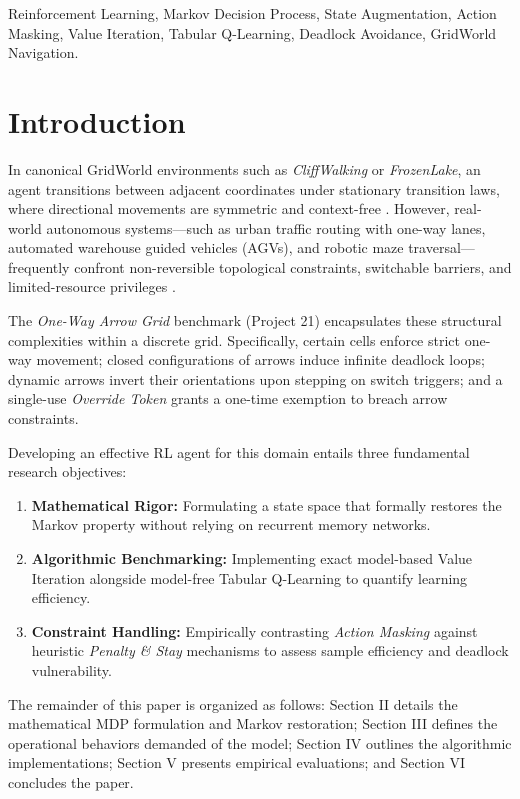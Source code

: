 \documentclass[conference]{IEEEtran}
\begin{document}
\begin{IEEEkeywords}
Reinforcement Learning, Markov Decision Process, State Augmentation, Action Masking, Value Iteration, Tabular Q-Learning, Deadlock Avoidance, GridWorld Navigation.
\end{IEEEkeywords}

\section{Introduction}
In canonical GridWorld environments such as \textit{CliffWalking} or \textit{FrozenLake}, an agent transitions between adjacent coordinates under stationary transition laws, where directional movements are symmetric and context-free \cite{sutton2018reinforcement}. However, real-world autonomous systems—such as urban traffic routing with one-way lanes, automated warehouse guided vehicles (AGVs), and robotic maze traversal—frequently confront non-reversible topological constraints, switchable barriers, and limited-resource privileges \cite{lavalle2006planning}.

The \textit{One-Way Arrow Grid} benchmark (Project 21) encapsulates these structural complexities within a discrete grid. Specifically, certain cells enforce strict one-way movement; closed configurations of arrows induce infinite deadlock loops; dynamic arrows invert their orientations upon stepping on switch triggers; and a single-use \textit{Override Token} grants a one-time exemption to breach arrow constraints.

Developing an effective RL agent for this domain entails three fundamental research objectives:
\begin{enumerate}
    \item \textbf{Mathematical Rigor:} Formulating a state space that formally restores the Markov property without relying on recurrent memory networks.
    \item \textbf{Algorithmic Benchmarking:} Implementing exact model-based Value Iteration alongside model-free Tabular Q-Learning to quantify learning efficiency.
    \item \textbf{Constraint Handling:} Empirically contrasting \textit{Action Masking} against heuristic \textit{Penalty \& Stay} mechanisms to assess sample efficiency and deadlock vulnerability.
\end{enumerate}

The remainder of this paper is organized as follows: Section II details the mathematical MDP formulation and Markov restoration; Section III defines the operational behaviors demanded of the model; Section IV outlines the algorithmic implementations; Section V presents empirical evaluations; and Section VI concludes the paper.
\end{document}
